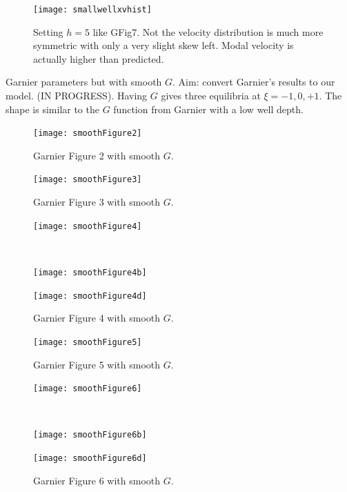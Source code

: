 \documentclass[11pt,a4paper, final, dvipsnames]{article}
\begin{document}
\begin{figure}
    \centering
    \texttt{[image: smallwellxvhist]}
    \caption{Setting $h=5$ like GFig7. Not the velocity distribution is much more symmetric with only a very slight skew left. Modal velocity is actually higher than predicted.}
\end{figure}


Garnier parameters but with smooth $G$. Aim: convert Garnier's results to our model.  (IN PROGRESS). Having $G$ gives three equilibria at $\xi = - 1, 0 ,+1$. The shape is similar to the $G$ function from Garnier with a low well depth.



    \begin{figure}
    \centering
    \texttt{[image: smoothFigure2]}
    \caption{Garnier Figure 2 with smooth $G$.}
\end{figure}

\begin{figure}
    \centering
    \texttt{[image: smoothFigure3]}
    \caption{Garnier Figure 3 with smooth $G$.}
\end{figure}

\begin{figure}
    \centering
    \begin{minipage}[b]{\textwidth}
        \centering
        
        \texttt{[image: smoothFigure4]}
    \end{minipage} \\
    
    \begin{minipage}[b]{0.49\textwidth}
        \centering
        \texttt{[image: smoothFigure4b]}
    \end{minipage} %
    \begin{minipage}[b]{0.49\textwidth}
        \centering                    \texttt{[image: smoothFigure4d]}
    \end{minipage}
    \caption{Garnier Figure 4 with smooth $G$.}
\end{figure}

\begin{figure}
    \centering
    \texttt{[image: smoothFigure5]}
    \caption{Garnier Figure 5 with smooth $G$.}
\end{figure}

\begin{figure}
    \centering
    \begin{minipage}[b]{\textwidth}
        \centering
        
        \texttt{[image: smoothFigure6]}
    \end{minipage} \\
    
    \begin{minipage}[b]{0.49\textwidth}
        \centering
        \texttt{[image: smoothFigure6b]}
    \end{minipage} %
    \begin{minipage}[b]{0.49\textwidth}
        \centering                    
        \texttt{[image: smoothFigure6d]}
    \end{minipage}
    \caption{Garnier Figure 6 with smooth $G$.}
\end{figure}
\end{document}
